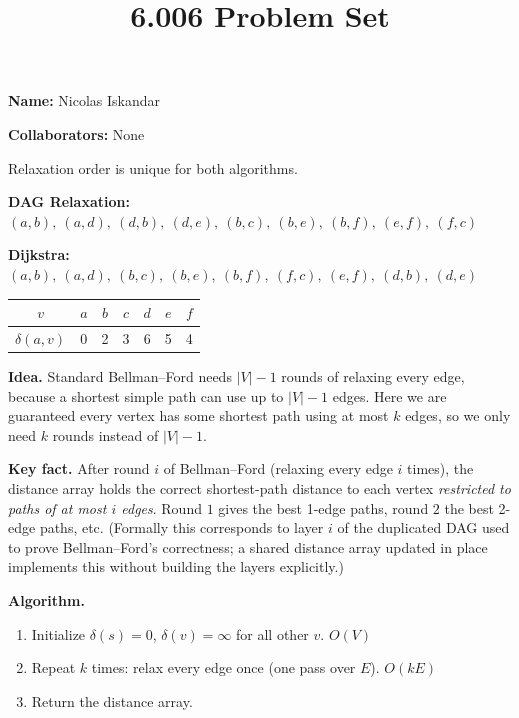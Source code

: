 \documentclass[12pt,twoside]{article}
\title{6.006 Problem Set \theproblemsetnum}
\newcommand{\theproblemsetnum}{6}
\begin{document}
\handout{Problem Set \theproblemsetnum}

\setlength{\parindent}{0pt}
\medskip\hrulefill\medskip

{\bf Name:} Nicolas Iskandar

\medskip

{\bf Collaborators:} None

\medskip\hrulefill

\begin{problems}

\problem  %

\begin{problemparts}

\problempart %
Relaxation order is unique for both algorithms.

\medskip

\textbf{DAG Relaxation:} $(a,b),\ (a,d),\ (d,b),\ (d,e),\ (b,c),\ (b,e),\ (b,f),\ (e,f),\ (f,c)$

\medskip
\textbf{Dijkstra:} $(a,b),\ (a,d),\ (b,c),\ (b,e),\ (b,f),\ (f,c),\ (e,f),\ (d,b),\ (d,e)$

\problempart %
\begin{center}
\begin{tabular}{c|cccccc}
$v$ & $a$ & $b$ & $c$ & $d$ & $e$ & $f$ \\
\hline
$\delta(a,v)$ & 0 & 2 & 3 & 6 & 5 & 4
\end{tabular}
\end{center}

\end{problemparts}

\problem  %
\textbf{Idea.} Standard Bellman--Ford needs $|V|-1$ rounds of relaxing every
edge, because a shortest simple path can use up to $|V|-1$ edges. Here we are
guaranteed every vertex has some shortest path using at most $k$ edges, so we
only need $k$ rounds instead of $|V|-1$.

\textbf{Key fact.} After round $i$ of Bellman--Ford (relaxing every edge $i$
times), the distance array holds the correct shortest-path distance to each
vertex \emph{restricted to paths of at most $i$ edges}. Round $1$ gives the
best 1-edge paths, round $2$ the best 2-edge paths, etc. (Formally this
corresponds to layer $i$ of the duplicated DAG used to prove Bellman--Ford's
correctness; a shared distance array updated in place implements this without
building the layers explicitly.)

\textbf{Algorithm.}
\begin{enumerate}
  \item Initialize $\delta(s)=0$, $\delta(v)=\infty$ for all other $v$. \quad $O(V)$
  \item Repeat $k$ times: relax every edge once (one pass over $E$). \quad $O(kE)$
  \item Return the distance array.
\end{enumerate}


\end{problems}
\end{document}
